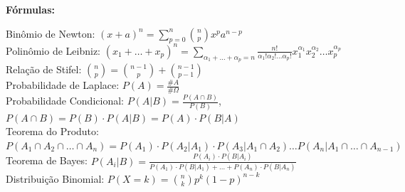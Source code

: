 \documentclass[a4paper,12pt]{article}  %
\begin{document}
\textbf{Fórmulas:}\\
\begin{small}
	Binômio de Newton: $(x+a)^n = \sum_{p=0}^{n}\binom{n}{p}x^p a^{n-p}$\\[2pt]
	Polinômio de Leibniz: $(x_1+\dots+x_p)^n = \sum_{\alpha_1+\dots +\alpha_p = n} \frac{n!}{\alpha_1! \alpha_2! \dots \alpha_p!} x_1^{\alpha_1} x_2^{\alpha_2} \dots x_p^{\alpha_p}$\\[2pt]
	Relação de Stifel: $\binom{n}{p}=\binom{n-1}{p}+\binom{n-1}{p-1}$\\[2pt]
	Probabilidade de Laplace: $P(A) = \frac{\# A}{\# \Omega}$\\[2pt]
	Probabilidade Condicional: $P(A|B) = \frac{P(A \cap B)}{P(B)}$, ~$P(A \cap B) = P(B) \cdot P(A|B) = P(A) \cdot P(B|A)$\\[2pt]
	Teorema do Produto: $P(A_1 \cap A_2 \cap \dots \cap A_n) = P(A_1) \cdot P(A_2 | A_1) \cdot P(A_3 | A_1 \cap A_2) \dots P(A_n | A_1 \cap \dots \cap A_{n-1})$\\[2pt]
	Teorema de Bayes: $P(A_i|B) = \frac{P(A_i) \cdot P(B|A_i)}{P(A_1) \cdot P(B|A_1) + \dots + P(A_n) \cdot P(B|A_n)}$\\[2pt]
	Distribuição Binomial: $P(X = k) = \binom{n}{k} p^k (1-p)^{n-k}$
\end{small}
\end{document}

